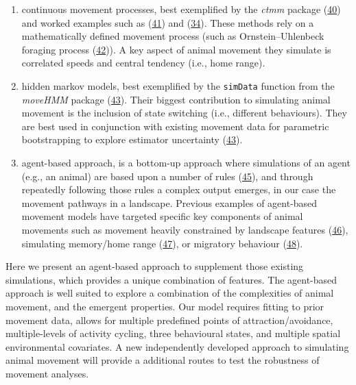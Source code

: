 \documentclass[10pt,a4paper]{article}
\begin{document}
\begin{enumerate}
\def\labelenumi{\arabic{enumi}.}
\item
  continuous movement processes, best exemplified by the \emph{ctmm} package (\protect\hyperlink{ref-Calabrese2016}{40}) and worked examples such as (\protect\hyperlink{ref-silva_autocorrelationinformed_2022}{41}) and (\protect\hyperlink{ref-theng_confronting_2022}{34}).
  These methods rely on a mathematically defined movement process (such as Ornstein--Uhlenbeck foraging process (\protect\hyperlink{ref-Fleming2014}{42})).
  A key aspect of animal movement they simulate is correlated speeds and central tendency (i.e., home range).
\item
  hidden markov models, best exemplified by the \texttt{simData} function from the \emph{moveHMM} package (\protect\hyperlink{ref-Michelot2016}{43}).
  Their biggest contribution to simulating animal movement is the inclusion of state switching (i.e., different behaviours).
  They are best used in conjunction with existing movement data for parametric bootstrapping to explore estimator uncertainty (\protect\hyperlink{ref-Michelot2016}{43}).
\item
  agent-based approach, is a bottom-up approach where simulations of an agent (e.g., an animal) are based upon a number of rules (\protect\hyperlink{ref-Tang2010}{45}), and through repeatedly following those rules a complex output emerges, in our case the movement pathways in a landscape.
  Previous examples of agent-based movement models have targeted specific key components of animal movements such as movement heavily constrained by landscape features (\protect\hyperlink{ref-quaglietta_simriv_2019}{46}), simulating memory/home range (\protect\hyperlink{ref-VanMoorter2009}{47}), or migratory behaviour (\protect\hyperlink{ref-bennett_modelling_2006}{48}).
\end{enumerate}

Here we present an agent-based approach to supplement those existing simulations, which provides a unique combination of features.
The agent-based approach is well suited to explore a combination of the complexities of animal movement, and the emergent properties.
Our model requires fitting to prior movement data, allows for multiple predefined points of attraction/avoidance, multiple-levels of activity cycling, three behavioural states, and multiple spatial environmental covariates.
A new independently developed approach to simulating animal movement will provide a additional routes to test the robustness of movement analyses.
\end{document}
